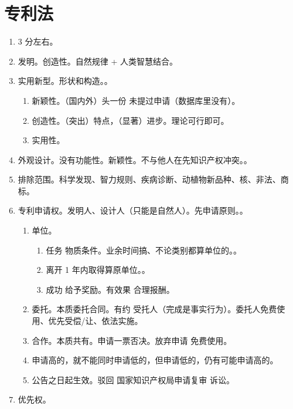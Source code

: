 \section{专利法}
\begin{enumerate}
  \item 3 分左右。
  \item 发明。创造性。自然规律 + 人类智慧结合。
  \item 实用新型。形状和构造。。
        \begin{enumerate}
          \item 新颖性。（国内外）头一份 \hz 未提过申请（数据库里没有）。
          \item 创造性。（突出）特点，（显著）进步。理论可行即可。
          \item 实用性。
        \end{enumerate}
  \item 外观设计。没有功能性。新颖性。不与他人在先知识产权冲突。。
  \item 排除范围。科学发现、智力规则、疾病诊断、动植物新品种、核、非法、商标。
  \item 专利申请权。发明人、设计人（只能是自然人）。先申请原则。。
        \begin{enumerate}
          \item 单位。
                \begin{enumerate}
                  \item 任务 \hz 物质条件。业余时间搞、不论类别都算单位的。。
                  \item 离开 1 年内取得算原单位。。
                  \item 成功 \yjt 给予奖励。有效果 \yjt 合理报酬。
                \end{enumerate}
          \item 委托。本质委托合同。有约 \yjt 受托人（完成是事实行为）。委托人免费使用、优先受偿/让、依法实施。
          \item 合作。本质共有。申请一票否决。放弃申请 \yjt 免费使用。
          \item 申请高的，就不能同时申请低的，但申请低的，仍有可能申请高的。
          \item 公告之日起生效。驳回 \yjt 国家知识产权局申请复审 \yjt 诉讼。
        \end{enumerate}
  \item 优先权。
        \begin{enumerate}

\end{enumerate}
\end{enumerate}
